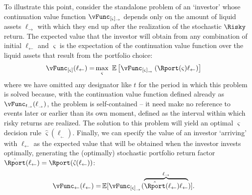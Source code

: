\documentclass[titlepage, headings=optiontotocandhead]{Resources/texmf-local/tex/latex/econtex}
\begin{document}
To illustrate this point, consider the standalone problem of an `investor' whose continuation value function $\vFunc_{[\varsigma]_\rightarrow}$ depends only on the amount of liquid assets $\ell_{\rightarrow}$ with which they end up after the realization of the stochastic $\Risky$ return.  The expected value that the investor will obtain from any combination of initial $\ell_{\leftarrow}$ and $\varsigma$ is the expectation of the continuation value function over the liquid assets that result from the portfolio choice:
\begin{equation}\begin{gathered}\begin{aligned}
      \vFunc_{[\varsigma]}({\ell_{\leftarrow}})
      = & \max_{\varsigma}~ \Ex\left[        \vFunc_{[\varsigma]_{_\rightarrow}}\left(\Rport(\varsigma){\ell_{\leftarrow}}        \right)
      \right] \label{eq:vMidStgShr}
    \end{aligned}\end{gathered}\end{equation}
where we have omitted any designator like $t$ for the period in which this problem is solved because, with the continuation value function defined already as $\vFunc_{t_\rightarrow}({\ell}_{_\rightarrow})$, the problem is self-contained -- it need make no reference to events later or earlier than its own moment, defined as the interval within which risky returns are realized.  The solution to this problem will yield an optimal $\varsigma$ decision rule $\hat{\varsigma}(\ell_{_\leftarrow}).$  Finally, we can specify the value of an investor `arriving' with $\ell_{\leftarrow}$ as the expected value that will be obtained when the investor invests optimally, generating the (optimally) stochastic portfolio return factor $\hat{\Rport}(\ell_{\leftarrow})=\Rport(\hat{\varsigma}(\ell_{\leftarrow}))$:
\begin{equation}\begin{gathered}\begin{aligned}
      \vFunc_{\leftarrow}({\ell_{\leftarrow}})  = & \Ex[\vFunc_{[\varsigma]_{_\rightarrow}}(\overbrace{
        \hat{\Rport}(\ell_{\leftarrow}){\ell_{\leftarrow}}}^{\ell_{\rightarrow}})].
    \end{aligned}\end{gathered}\end{equation}
\end{document}
